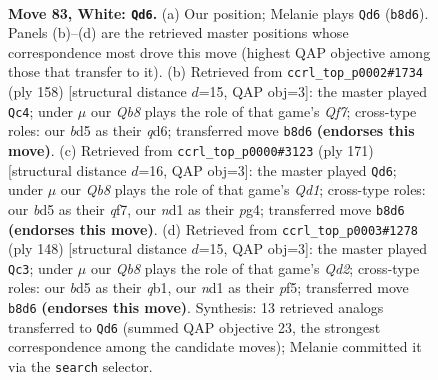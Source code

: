 \documentclass[11pt]{article}
\begin{document}
\clearpage

\begin{figure}[p]\centering
\begin{subfigure}{0.46\textwidth}\centering
\resizebox{\linewidth}{!}{%
\newchessgame
\chessboard[
  setfen={1Q6/P6k/8/3b4/5K2/8/8/3n4 w - - 3 83},
  showmover=false,
  pgfstyle=straightmove, color=movearrow, markmove={b8-d6}
]}
\caption{}
\end{subfigure}\hfill
\begin{subfigure}{0.46\textwidth}\centering
\resizebox{\linewidth}{!}{%
\newchessgame
\chessboard[
  setfen={2k5/5Q2/2nq4/8/8/8/KP6/8 w - - 38 80},
  showmover=false,
  pgfstyle=straightmove, color=movearrow, markmove={f7-c4}
]}
\caption{}
\end{subfigure}
\\[4pt]
\begin{subfigure}{0.46\textwidth}\centering
\resizebox{\linewidth}{!}{%
\newchessgame
\chessboard[
  setfen={3q3k/5Q2/8/8/4K1P1/p7/8/8 b - - 15 86},
  showmover=false,
  pgfstyle=straightmove, color=movearrow, markmove={d8-d6}
]}
\caption{}
\end{subfigure}\hfill
\begin{subfigure}{0.46\textwidth}\centering
\resizebox{\linewidth}{!}{%
\newchessgame
\chessboard[
  setfen={8/8/8/K4p2/8/4P1k1/3Q4/1q6 w - - 16 75},
  showmover=false,
  pgfstyle=straightmove, color=movearrow, markmove={d2-c3}
]}
\caption{}
\end{subfigure}
\caption{\textbf{Move 83, White: \texttt{Qd6}.} (a) Our position; Melanie plays \texttt{Qd6} (\texttt{b8d6}). Panels (b)--(d) are the retrieved master positions whose correspondence most drove this move (highest QAP objective among those that transfer to it). (b) Retrieved from \texttt{ccrl\_top\_p0002\#1734} (ply 158) [structural distance $d$=15, QAP obj=3]: the master played \texttt{Qc4}; under $\mu$ our \emph{Qb8} plays the role of that game's \emph{Qf7}; cross-type roles: our \emph{b}d5 as their \emph{q}d6; transferred move \texttt{b8d6} \textbf{(endorses this move)}. (c) Retrieved from \texttt{ccrl\_top\_p0000\#3123} (ply 171) [structural distance $d$=16, QAP obj=3]: the master played \texttt{Qd6}; under $\mu$ our \emph{Qb8} plays the role of that game's \emph{Qd1}; cross-type roles: our \emph{b}d5 as their \emph{q}f7, our \emph{n}d1 as their \emph{p}g4; transferred move \texttt{b8d6} \textbf{(endorses this move)}. (d) Retrieved from \texttt{ccrl\_top\_p0003\#1278} (ply 148) [structural distance $d$=15, QAP obj=3]: the master played \texttt{Qc3}; under $\mu$ our \emph{Qb8} plays the role of that game's \emph{Qd2}; cross-type roles: our \emph{b}d5 as their \emph{q}b1, our \emph{n}d1 as their \emph{p}f5; transferred move \texttt{b8d6} \textbf{(endorses this move)}. Synthesis: 13 retrieved analogs transferred to \texttt{Qd6} (summed QAP objective 23, the strongest correspondence among the candidate moves); Melanie committed it via the \texttt{search} selector.}
\label{fig:thought-m164}
\end{figure}
\end{document}
